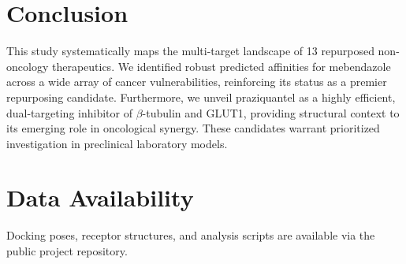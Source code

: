 \documentclass[10pt,a4paper,twocolumn]{article}
\begin{document}
\section{Conclusion}
This study systematically maps the multi-target landscape of 13 repurposed non-oncology therapeutics. We identified robust predicted affinities for mebendazole across a wide array of cancer vulnerabilities, reinforcing its status as a premier repurposing candidate. Furthermore, we unveil praziquantel as a highly efficient, dual-targeting inhibitor of $\beta$-tubulin and GLUT1, providing structural context to its emerging role in oncological synergy. These candidates warrant prioritized investigation in preclinical laboratory models.

\section*{Data Availability}
Docking poses, receptor structures, and analysis scripts are available via the public project repository.
\end{document}
